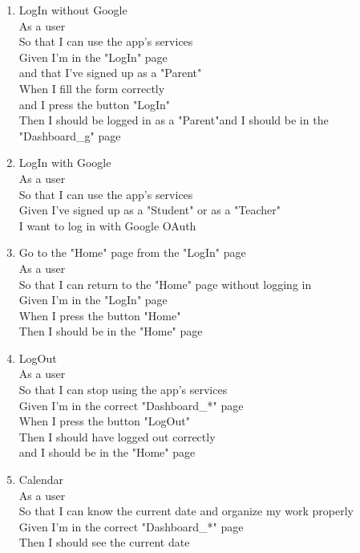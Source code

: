 \documentclass[Lau, binding=0.6cm]{sapthesis}
\begin{document}
\begin{enumerate}
	\item LogIn without Google\\
			As a user\\
			So that I can use the app’s services\\
			Given I’m in the "LogIn" page\\
			and that I’ve signed up as a "Parent"\\
			When I fill the form correctly\\
			and I press the button "LogIn"\\
			Then I should be logged in as a "Parent"and I should be in the "Dashboard\_g" page\\
	\item LogIn with Google\\
			As a user\\
			So that I can use the app’s services\\
			Given I’ve signed up as a "Student" or as a "Teacher"\\
			I want to log in with Google OAuth\\
	\item Go to the "Home" page from the "LogIn" page\\
			As a user\\
			So that I can return to the "Home" page without logging in\\
			Given I’m in the "LogIn" page\\
			When I press the button "Home"\\
			Then I should be in the "Home" page\\
	\item LogOut\\
			As a user\\
			So that I can stop using the app’s services\\
			Given I’m in the correct "Dashboard\_*" page\\
			When I press the button "LogOut"\\
			Then I should have logged out correctly\\
			and I should be in the "Home" page\\
	\item Calendar\\
			As a user\\
			So that I can know the current date and organize my work properly\\
			Given I’m in the correct "Dashboard\_*" page\\
			Then I should see the current date\\

\end{enumerate}
\end{document}
